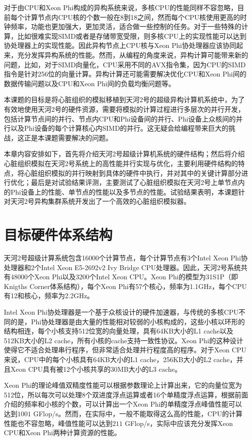 对于由CPU和Xeon Phi构成的异构系统来说，多核CPU的性能同样不容忽略，目前每个计算节点内CPU核的个数一般在8到18之间，然而每个CPU核使用更高的时钟频率，功能也更加强大，更加灵活，适合做一些控制的任务。对于一些特殊的计算，比如很难实现SIMD或者是存储带宽受限，则多核CPU上的实现性能可以达到协处理器上的实现性能。因此异构节点上CPU核与Xeon Phi协处理器应该协同起来，充分发挥异构系统的性能。然而，从编程的角度来说，异构计算可能带来新的问题，比如，对于SIMD向量化，CPU采用不同的AVX指令集，因为CPU的SIMD指令是针对256位的向量计算。异构计算还可能需要解决优化CPU和Xeon Phi间的数据传输问题以及CPU和Xeon Phi间的负载均衡问题等。

本课题的目标是将心脏组织的模拟移植到天河2号的超级异构计算机系统中，为了有效地使用天河2号的硬件资源，需要将模拟的计算过程进行多层次的并行开发，包括计算节点间的并行、节点内CPU和Phi设备间的并行、Phi设备上众核间的并行以及Phi设备的每个计算核心内SIMD的并行。这无疑会给编程带来巨大的挑战，这正是本课题需要解决的问题。

本章内容安排如下，首先将介绍天河2号超级计算机系统的硬件结构；然后将介绍心脏组织模拟在天河2号系统上的高性能并行实现与优化，主要利用硬件结构的特点，将心脏组织模拟的并行映射到具体的硬件中执行，并对其中的关键计算部分进行优化；最后是对试验结果评测，主要测试了心脏组织模拟在天河2号上单节点内的Phi设备上的性能、单节点的性能以及多节点的性能。试验结果表明，本课题针对天河2号异构集群系统开发出了一个高效的心脏组织模拟器。

\section{目标硬件体系结构}

天河2号超级计算系统包含16000个计算节点，每个计算节点有3个Intel Xeon Phi协处理器和2个Intel Xeon E5-2692v2 Ivy Bridge CPU处理器。因此，天河2号系统共有48000个Xeon Phi以及3200个Intel Xeon CPU。Xeon Phi的模型为31S1P（即Knigths Corner体系结构），每个Xeon Phi有57个核心，频率为1.1GHz，每个CPU有12和核心，频率为2.2GHz。

Intel Xeon Phi协处理器是一个基于众核设计的硬件加速器，与传统的多核CPU不同的是，Phi协处理器是由大量的性能相对较弱的小核构成的，这些小核以环形的结构相连，每个小核支持512位宽的向量处理，具有64KB大小的L1 cache以及512KB大小的L2 cache，所有小核的cache支持一致性协议。Xeon Phi的这种设计使得它不适合处理串行程序，但非常适合处理并行程度高的程序。对于Xeon CPU来说，CPU中的每个小核具有64KB大小的L1 cache，256KB大小的L2 cache，并且Xeon CPU具有被12个小核共享的30MB大小的L3 cache。

Xeon Phi的理论峰值双精度性能可以根据参数理论上计算出来，它的向量位宽为512位，所以每次可以处理8个双进度浮点运算或者16个单精度浮点运算，根据前面介绍的频率和小核的个数，可以计算出一个Xeon Phi的单精度浮点峰值性能可以达到$1001$ GFlop/s。然而，在实际中，一般不能取得这么高的性能，CPU的计算性能也不容忽略，峰值性能可以达到$211$ GFlop/s，实际中应该充分发挥Xeon CPU和Xeon Phi两种计算资源的性能。

